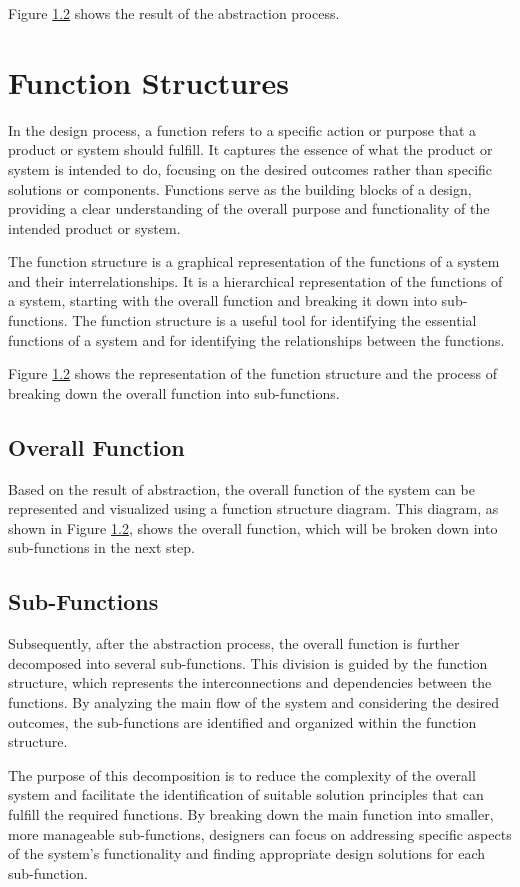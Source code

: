 Figure \ref{} shows the result of the abstraction process.

\section{Function Structures}
In the design process, a function refers to a specific action or purpose that a product or system should fulfill. It captures the essence of what the product or system is intended to do, focusing on the desired outcomes rather than specific solutions or components. Functions serve as the building blocks of a design, providing a clear understanding of the overall purpose and functionality of the intended product or system.

The function structure is a graphical representation of the functions of a system and their interrelationships. It is a hierarchical representation of the functions of a system, starting with the overall function and breaking it down into sub-functions. The function structure is a useful tool for identifying the essential functions of a system and for identifying the relationships between the functions. \cite{Pahl07e}

Figure \ref{} shows the representation of the function structure and the process of breaking down the overall function into sub-functions.


\subsection{Overall Function}
Based on the result of abstraction, the overall function of the system can be represented and visualized using a function structure diagram. This diagram, as shown in Figure \ref{}, shows the overall function, which will be broken down into sub-functions in the next step.

\subsection{Sub-Functions}
Subsequently, after the abstraction process, the overall function is further decomposed into several sub-functions. This division is guided by the function structure, which represents the interconnections and dependencies between the functions. By analyzing the main flow of the system and considering the desired outcomes, the sub-functions are identified and organized within the function structure.

The purpose of this decomposition is to reduce the complexity of the overall system and facilitate the identification of suitable solution principles that can fulfill the required functions. By breaking down the main function into smaller, more manageable sub-functions, designers can focus on addressing specific aspects of the system's functionality and finding appropriate design solutions for each sub-function.


